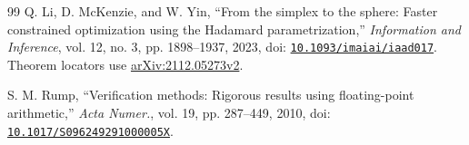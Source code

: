 \documentclass[10pt,a4paper]{article}
\begin{document}
\begin{thebibliography}{99}
 Q. Li, D. McKenzie, and W. Yin, ``From the simplex to the sphere: Faster constrained optimization using the Hadamard parametrization,'' \emph{Information and Inference}, vol. 12, no. 3, pp. 1898--1937, 2023, doi: \href{https://doi.org/10.1093/imaiai/iaad017}{\nolinkurl{10.1093/imaiai/iaad017}}. Theorem locators use \href{https://arxiv.org/abs/2112.05273v2}{arXiv:2112.05273v2}.

 S. M. Rump, ``Verification methods: Rigorous results using floating-point arithmetic,'' \emph{Acta Numer.}, vol. 19, pp. 287--449, 2010, doi: \href{https://doi.org/10.1017/S096249291000005X}{\nolinkurl{10.1017/S096249291000005X}}.
\end{thebibliography}
\end{document}
